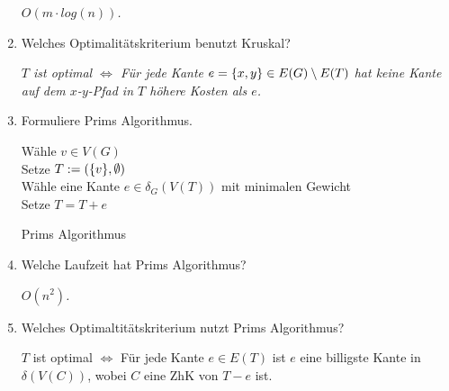 \documentclass[a4paper,10pt]{scrreprt}
\begin{document}
\begin{enumerate}
		\textit{$O(m\cdot log(n))$.}
		\item Welches Optimalitätskriterium benutzt Kruskal?
		
		\textit{$T$ ist optimal $\Leftrightarrow$ Für jede Kante $e=\{x,y\} \in E(G)\setminus E(T)$ hat keine Kante auf dem $x$-$y$-Pfad in $T$ höhere Kosten als $e$.}
		\item Formuliere Prims Algorithmus.
			\begin{algorithm}
				\vspace*{5pt}
				Wähle $v\in V(G)$\\
				Setze $T:=(\{v\}, \emptyset)$\\
				{
					Wähle eine Kante $e\in \delta_G(V(T))$ mit minimalen Gewicht\\
					Setze $T=T+e$
				}
				\caption{Prims Algorithmus}
			\end{algorithm}
		\item Welche Laufzeit hat Prims Algorithmus?
		
		\textit{$O(n^2)$.}
		\item Welches Optimaltitätskriterium nutzt Prims Algorithmus?
		
		$T$ ist optimal $\Leftrightarrow$ Für jede Kante $e\in E(T)$ ist $e$ eine billigste Kante in $\delta(V(C))$, wobei $C$ eine ZhK von $T-e$ ist.
	\end{enumerate}
\end{document}
